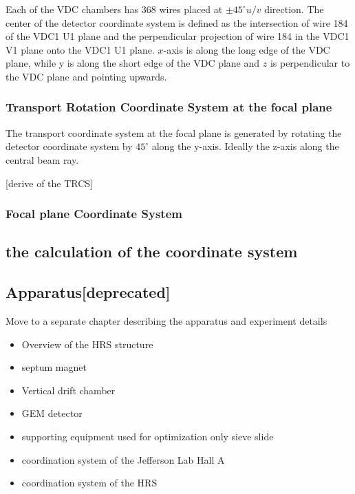 Each of the VDC chambers has 368 wires placed at $\pm 45 ^{\circ} u/v$ direction. The center of the detector coordinate system is defined as the intersection of wire 184 of the VDC1 U1 plane and the perpendicular projection of wire 184 in the VDC1 V1 plane onto the VDC1 U1 plane. $x$-axis is along the long edge of the VDC plane, while y is along the short edge of the VDC plane and $z$ is perpendicular to the VDC plane and pointing upwards. 


\subsubsection{Transport Rotation Coordinate System at the focal plane}
The transport coordinate system at the focal plane is generated by rotating the detector coordinate system by $45^{\circ}$ along the y-axis. Ideally the z-axis along the central beam ray. 

[derive of the TRCS]


\subsubsection{Focal plane Coordinate System}




\subsection{the calculation of the coordinate system}



\subsection{Apparatus[deprecated]}

Move to a separate chapter describing the apparatus and experiment details

\begin{itemize}
    \item Overview of the HRS structure
    \item septum magnet 
    \item Vertical drift chamber 
    \item GEM detector
    \item supporting equipment used for optimization only sieve slide

    \item coordination system of the Jefferson Lab Hall A
    \item coordination system of the HRS
\end{itemize}


